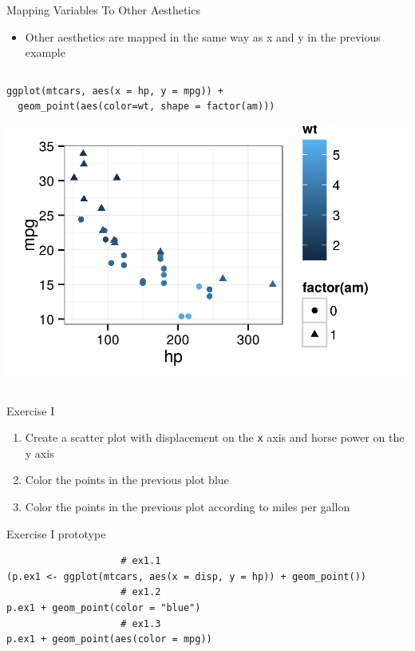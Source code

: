 \documentclass[table,smaller]{beamer}
\begin{document}
\begin{frame}[fragile,label=sec-2-8]{Mapping Variables To Other Aesthetics}
 \begin{itemize}
\item Other aesthetics are mapped in the same way as x and y in the previous example
\end{itemize}

\begin{columns}  \begin{block}{}

\begin{verbatim}
ggplot(mtcars, aes(x = hp, y = mpg)) +
  geom_point(aes(color=wt, shape = factor(am)))
\end{verbatim}

\includegraphics[width=.9\linewidth]{images/addColorAndShapeMapping.png}

\end{block} \end{columns}
\end{frame}

\begin{frame}[fragile,label=sec-2-9]{Exercise I}
 \begin{enumerate}
\item Create a scatter plot with displacement on the \texttt{x} axis and horse power on the y axis
\item Color the points in the previous plot blue
\item Color the points in the previous plot according to miles per gallon
\end{enumerate}
\end{frame}

\begin{frame}[fragile,label=sec-2-10]{Exercise I prototype}
 \begin{verbatim}
					# ex1.1
(p.ex1 <- ggplot(mtcars, aes(x = disp, y = hp)) + geom_point())
					# ex1.2
p.ex1 + geom_point(color = "blue")
					# ex1.3
p.ex1 + geom_point(aes(color = mpg))
\end{verbatim}
\end{frame}
\end{document}
